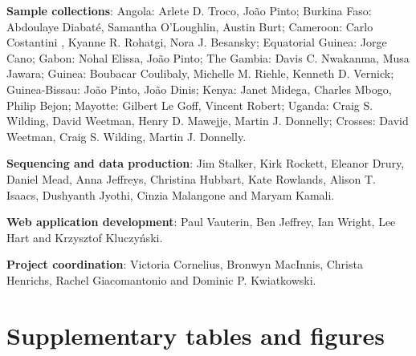 \documentclass[a4paper,11pt,abstracton,hidelinks]{scrartcl}
\newcommand{\beginsupplement}{%
  \setcounter{table}{0}
  \renewcommand{\thetable}{S\arabic{table}}%
  \setcounter{figure}{0}
  \renewcommand{\thefigure}{S\arabic{figure}}%
}
\begin{document}
%
\textbf{Sample collections}: Angola: Arlete D. Troco, Jo\~{a}o Pinto; Burkina Faso: Abdoulaye Diabat\'{e}, Samantha O'Loughlin, Austin Burt; Cameroon: Carlo Costantini , Kyanne R. Rohatgi, Nora J. Besansky; Equatorial Guinea: Jorge Cano; Gabon: Nohal Elissa, Jo\~{a}o Pinto; The Gambia: Davis C. Nwakanma, Musa Jawara; Guinea: Boubacar Coulibaly, Michelle M. Riehle, Kenneth D. Vernick; Guinea-Bissau: Jo\~{a}o Pinto, Jo\~{a}o Dinis; Kenya: Janet Midega, Charles Mbogo, Philip Bejon; Mayotte: Gilbert Le Goff, Vincent Robert; Uganda: Craig S. Wilding, David Weetman, Henry D. Mawejje, Martin J. Donnelly; Crosses: David Weetman, Craig S. Wilding, Martin J. Donnelly.

%
\textbf{Sequencing and data production}: Jim Stalker, Kirk Rockett, Eleanor Drury, Daniel Mead, Anna Jeffreys, Christina Hubbart, Kate Rowlands, Alison T. Isaacs, Dushyanth Jyothi, Cinzia Malangone and Maryam Kamali.

%
\textbf{Web application development}: Paul Vauterin, Ben Jeffrey, Ian Wright, Lee Hart and Krzysztof Kluczy\'{n}ski.

%
\textbf{Project coordination}: Victoria Cornelius, Bronwyn MacInnis, Christa Henrichs, Rachel Giacomantonio and Dominic P. Kwiatkowski.







\beginsupplement

\section*{Supplementary tables and figures}

%
\end{document}
